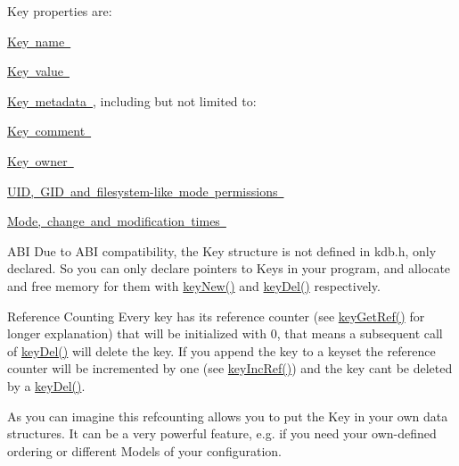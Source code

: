 Key properties are\+:
\begin{DoxyItemize}
\item \mbox{\hyperlink{group__keyname}{Key name }}
\item \mbox{\hyperlink{group__keyvalue}{Key value }}
\item \mbox{\hyperlink{group__keymeta}{Key metadata }}, including but not limited to\+:
\begin{DoxyItemize}
\item \mbox{\hyperlink{group__meta_gafb89735689929ff717cc9f2d0d0b46a2}{Key comment }}
\item \mbox{\hyperlink{owner_8c_a35922a017bee8b4bcb493bbdfad9d6f5}{Key owner }}
\item \mbox{\hyperlink{group__keymeta}{U\+ID, G\+ID and filesystem-\/like mode permissions }}
\item \mbox{\hyperlink{group__keymeta}{Mode, change and modification times }}
\end{DoxyItemize}
\end{DoxyItemize}

\begin{DoxyParagraph}{A\+BI}
Due to A\+BI compatibility, the {\ttfamily Key} structure is not defined in kdb.\+h, only declared. So you can only declare {\ttfamily pointers} to {\ttfamily Keys} in your program, and allocate and free memory for them with \mbox{\hyperlink{group__key_gad23c65b44bf48d773759e1f9a4d43b89}{key\+New()}} and \mbox{\hyperlink{group__key_ga3df95bbc2494e3e6703ece5639be5bb1}{key\+Del()}} respectively.
\end{DoxyParagraph}
\begin{DoxyParagraph}{Reference Counting}
Every key has its reference counter (see \mbox{\hyperlink{group__key_ga4aabc4272506dd63161db2bbb42de8ae}{key\+Get\+Ref()}} for longer explanation) that will be initialized with 0, that means a subsequent call of \mbox{\hyperlink{group__key_ga3df95bbc2494e3e6703ece5639be5bb1}{key\+Del()}} will delete the key. If you append the key to a keyset the reference counter will be incremented by one (see \mbox{\hyperlink{group__key_ga6970a6f254d67af7e39f8e469bb162f1}{key\+Inc\+Ref()}}) and the key can\textquotesingle{}t be deleted by a \mbox{\hyperlink{group__key_ga3df95bbc2494e3e6703ece5639be5bb1}{key\+Del()}}.
\end{DoxyParagraph}
\begin{DoxyParagraph}{}
As you can imagine this refcounting allows you to put the Key in your own data structures. It can be a very powerful feature, e.\+g. if you need your own-\/defined ordering or different Models of your configuration. 
\end{DoxyParagraph}


